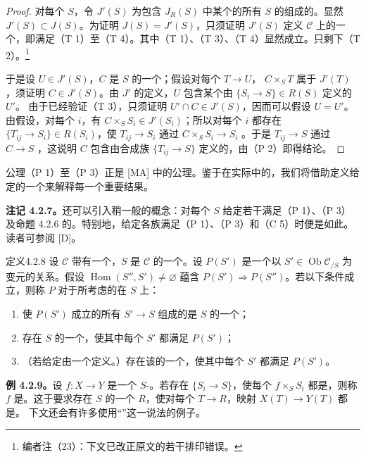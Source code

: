 \begin{proof}
对每个 $S$，令 $J'(S)$ 为包含 $J_R(S)$ 中某个的所有 $S$ 的组成的。显然 $J'(S)\subset J(S)$。为证明 $J(S)=J'(S)$，只须证明 $J'(S)$ 定义 $\mathcal C$ 上的一个，即满足（T 1）至（T 4）。其中（T 1）、（T 3）、（T 4）显然成立。只剩下（T 2）。\footnote{编者注（23）：下文已改正原文的若干排印错误。}

于是设 $U\in J'(S)$，$C$ 是 $S$ 的一个；假设对每个 $T\to U$， $C\times_S T$ 属于 $J'(T)$，须证明 $C\in J'(S)$。由 $J'$ 的定义，$U$ 包含某个由 $\{S_i\to S\}\in R(S)$ 定义的 $U'$。
由于已经验证（T 3），只须证明 $U'\cap C\in J'(S)$，因而可以假设 $U=U'$。由假设，对每个 $i$，有 $C\times_S S_i\in J'(S_i)$；所以对每个 $i$ 都存在 $\{T_{ij}\to S_i\}\in R(S_i)$，使 $T_{ij}\to S_i$ 通过 $C\times_S S_i\to S_i$ 。于是 $T_{ij}\to S$ 通过 $C\to S$ ，这说明 $C$ 包含由合成族 $\{T_{ij}\to S\}$ 定义的，由（P 2）即得结论。
\end{proof}
公理（P 1）至（P 3）正是 [MA] 中的公理。鉴于在实际中的，我们将借助定义给定的一个来解释每一个重要结果。

\textbf{注记 4.2.7。}还可以引入稍一般的概念：对每个 $S$ 给定若干满足（P 1）、（P 3）及命题 4.2.6 的。特别地，给定各族满足（P 1）、（P 3）和（C 5）时便是如此。读者可参阅 [D]。
\begin{SGAresult}{定义}{4.2.8}
设 $\mathcal C$ 带有一个，$S$ 是 $\mathcal C$ 的一个。设 $P(S')$ 是一个以 $S'\in\operatorname{Ob}\mathcal C_{/S}$ 为变元的关系。假设 $\operatorname{Hom}(S'',S')\ne\varnothing$ 蕴含 $P(S')\Rightarrow P(S'')$。若以下条件成立，则称 $P$ 对于所考虑的在 $S$ 上：
\begin{enumerate}
\item[(i)] 使 $P(S')$ 成立的所有 $S'\to S$ 组成的是 $S$ 的一个；
\item[(ii)] 存在 $S$ 的一个，使其中每个 $S'$ 都满足 $P(S')$；
\item[(iii)] （若给定由一个定义。）存在该的一个，使其中每个 $S'$ 都满足 $P(S')$。
\end{enumerate}
\end{SGAresult}
\textbf{例 4.2.9。}设 $f:X\to Y$ 是一个 $S$-。若存在 $\{S_i\to S\}$，使每个 $f\times_S S_i$ 都是，则称 $f$ 是。这于要求存在 $S$ 的一个 $R$，使对每个 $T\to R$，映射 $X(T)\to Y(T)$ 都是。
下文还会有许多使用“”这一说法的例子。

